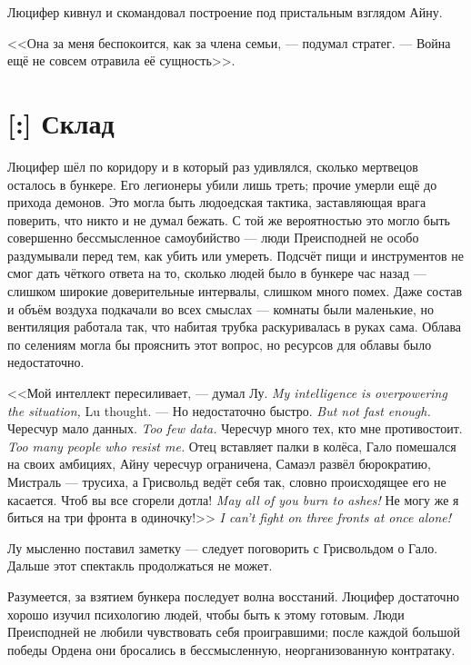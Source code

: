 Люцифер кивнул и скомандовал построение под пристальным взглядом Айну.

<<Она за меня беспокоится, как за члена семьи, --- подумал стратег.
--- Война ещё не совсем отравила её сущность>>.

\section{[:] Склад}

Люцифер шёл по коридору и в который раз удивлялся, сколько мертвецов осталось в бункере.
Его легионеры убили лишь треть;
прочие умерли ещё до прихода демонов.
Это могла быть людоедская тактика, заставляющая врага поверить, что никто и не думал бежать.
С той же вероятностью это могло быть совершенно бессмысленное самоубийство --- люди Преисподней не особо раздумывали перед тем, как убить или умереть.
Подсчёт пищи и инструментов не смог дать чёткого ответа на то, сколько людей было в бункере час назад --- слишком широкие доверительные интервалы, слишком много помех.
Даже состав и объём воздуха подкачали во всех смыслах --- комнаты были маленькие, но вентиляция работала так, что набитая трубка раскуривалась в руках сама.
Облава по селениям могла бы прояснить этот вопрос, но ресурсов для облавы было недостаточно.

{<<Мой интеллект пересиливает, --- думал Лу.}
{\textit{My intelligence is overpowering the situation,} Lu thought.}
{--- Но недостаточно быстро.}
{\textit{But not fast enough.}}
{Чересчур мало данных.}
{\textit{Too few data.}}
{Чересчур много тех, кто мне противостоит.}
{\textit{Too many people who resist me.}}
Отец вставляет палки в колёса, Гало помешался на своих амбициях, Айну чересчур ограничена, Самаэл развёл бюрократию, Мистраль --- трусиха, а Грисвольд ведёт себя так, словно происходящее его не касается.
{Чтоб вы все сгорели дотла!}
{\textit{May all of you burn to ashes!}}
{Не могу же я биться на три фронта в одиночку!>>}
{\textit{I can't fight on three fronts at once alone!}}

Лу мысленно поставил заметку --- следует поговорить с Грисвольдом о Гало.
Дальше этот спектакль продолжаться не может.

Разумеется, за взятием бункера последует волна восстаний.
Люцифер достаточно хорошо изучил психологию людей, чтобы быть к этому готовым.
Люди Преисподней не любили чувствовать себя проигравшими;
после каждой большой победы Ордена они бросались в бессмысленную, неорганизованную контратаку.

